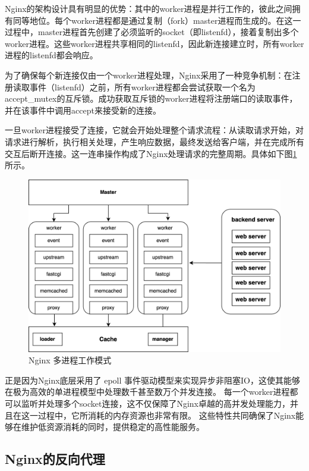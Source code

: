 Nginx的架构设计具有明显的优势：其中的worker进程是并行工作的，彼此之间拥有同等地位。每个worker进程都是通过复制（fork）master进程而生成的。在这一过程中，master进程首先创建了必须监听的socket（即listenfd），接着复制出多个worker进程。这些worker进程共享相同的listenfd，因此新连接建立时，所有worker进程的listenfd都会响应。

为了确保每个新连接仅由一个worker进程处理，Nginx采用了一种竞争机制：在注册读取事件（listenfd）之前，所有worker进程都会尝试获取一个名为accept\_mutex的互斥锁。成功获取互斥锁的worker进程将注册端口的读取事件，并在该事件中调用accept来接受新的连接。

一旦worker进程接受了连接，它就会开始处理整个请求流程：从读取请求开始，对请求进行解析，执行相关处理，产生响应数据，最终发送给客户端，并在完成所有交互后断开连接。这一连串操作构成了Nginx处理请求的完整周期。具体如下图\ref{nginx_multi_process}所示。

\begin{figure}[htbp]
	\centering
	\includegraphics[width=\textwidth]{figures/master-worker.png}
	\caption{Nginx 多进程工作模式}
	\label{nginx_multi_process}
\end{figure}

正是因为Nginx底层采用了 epoll 事件驱动模型来实现异步非阻塞IO，这使其能够在极为高效的单进程模型中处理数千甚至数万个并发连接。
每一个worker进程都可以监听并处理多个socket连接，这不仅保障了Nginx卓越的高并发处理能力，并且在这一过程中，它所消耗的内存资源也非常有限\cite{张炜森2018nginx}。
这些特性共同确保了Nginx能够在维护低资源消耗的同时，提供稳定的高性能服务。

\subsection{Nginx的反向代理}

